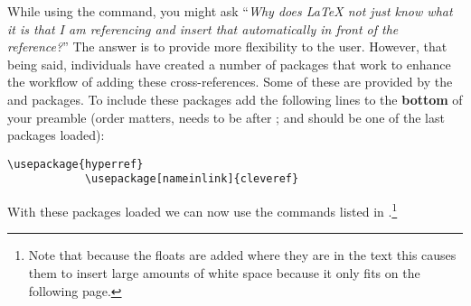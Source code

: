 		While using the  command, you might ask \enquote{\textit{Why does \LaTeX{} not just know what it is that I am referencing and insert that automatically in front of the reference?}}
		The answer is to provide more flexibility to the user.
		However, that being said, individuals have created a number of packages that work to enhance the workflow of adding these cross-references.
		Some of these are provided by the  and  packages.
		To include these packages add the following lines to the \textbf{bottom} of your preamble (order matters,  needs to be after ; and  should be one of the last packages loaded):
		\begin{lstlisting}[style=LaTeXStyle]
			\usepackage{hyperref}
			\usepackage[nameinlink]{cleveref}
		\end{lstlisting}
		With these packages loaded we can now use the commands listed in .\footnote{Note that because the floats are added where they are in the text this causes them to insert large amounts of white space because it only fits on the following page.}
